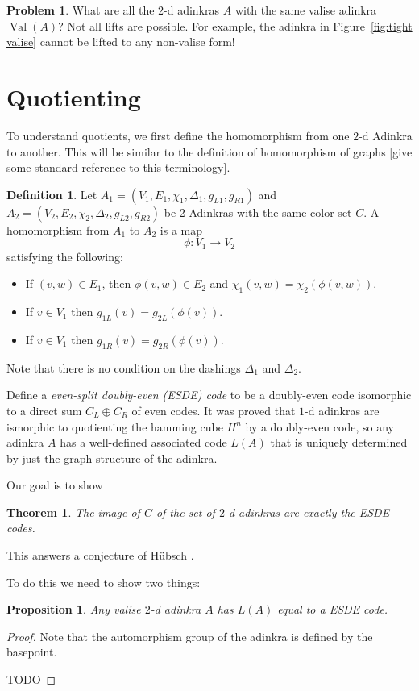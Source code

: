 \documentclass[12pt,twoside,singlespace]{article}
\numberwithin{equation}{section}
\newtheorem{thm}[equation]{Theorem}
\newtheorem{prop}[equation]{Proposition}
\theoremstyle{definition}
\newtheorem{definition}[equation]{Definition}
\newtheorem{prob}{Problem}
\newcommand{\on}{\operatorname}
\newcommand{\val}{\on{Val}}
\begin{document}
\begin{prob}
What are all the $2$-d adinkras $A$ with the same valise adinkra $\val(A)$? Not all lifts are possible. For example, the adinkra in Figure~\ref{fig:tight valise} cannot be lifted to any non-valise form!
\end{prob}

\section{Quotienting}
To understand quotients, we first define the homomorphism from one $2$-d Adinkra to another.  This will be similar to the definition of homomorphism of graphs [give some standard reference to this terminology].

\begin{definition}
Let 
$A_1=(V_1,E_1,\chi_1,\Delta_1,g_{L1},g_{R1})$
and
$A_2=(V_2,E_2,\chi_2,\Delta_2,g_{L2},g_{R2})$
be 2-Adinkras with the same color set $C$.  A homomorphism from $A_1$ to $A_2$ is a map
\[\phi:V_1\to V_2\]
satisfying the following:
\begin{itemize}
\item If $(v,w)\in E_1$, then $\phi(v,w)\in E_2$ and $\chi_1(v,w)=\chi_2(\phi(v,w))$.
\item If $v\in V_1$ then $g_{1L}(v)=g_{2L}(\phi(v))$.
\item If $v\in V_1$ then $g_{1R}(v)=g_{2R}(\phi(v))$.
\end{itemize}
Note that there is no condition on the dashings $\Delta_1$ and $\Delta_2$.
\end{definition}



Define a \emph{even-split doubly-even (ESDE) code} to be a doubly-even code isomorphic to a direct sum $C_L \oplus C_R$ of even codes. It was proved \cite{blah} that $1$-d adinkras are ismorphic to quotienting the hamming cube $H^n$ by a doubly-even code, so any adinkra $A$ has a well-defined associated code $L(A)$ that is uniquely determined by just the graph structure of the adinkra.

Our goal is to show
\begin{thm}
The image of $C$ of the set of $2$-d adinkras are exactly the ESDE codes.
\end{thm}

This answers a conjecture of H\"{u}bsch \cite{}.

To do this we need to show two things:

\begin{prop}
Any valise $2$-d adinkra $A$ has $L(A)$ equal to a ESDE code.
\end{prop}
\begin{proof}

Note that the automorphism group of the adinkra is defined by the basepoint.

TODO
\end{proof}
\end{document}
